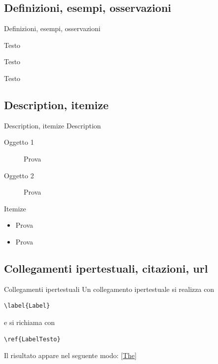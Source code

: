 \documentclass[aspectratio=169, compress]{beamer}
\begin{document}
\subsection{Definizioni, esempi, osservazioni}
\begin{frame}[squeeze]{Definizioni, esempi, osservazioni}
\begin{De}	 Testo	\end{De}\vspace{1cm}
\begin{Exa}			Testo		\end{Exa}\vspace{1cm}
\begin{Oss}	Testo		\end{Oss}
\end{frame}
\subsection{Description, itemize}
\begin{frame}{Description, itemize}
Description
\begin{description}
	\item[Oggetto 1] Prova
	\item[Oggetto 2] Prova
\end{description}
Itemize
\begin{itemize}
	\item Prova
	\item Prova
\end{itemize}
\end{frame}
\subsection{Collegamenti ipertestuali, citazioni, url}
\begin{frame}{Collegamenti ipertestuali}
	Un collegamento ipertestuale si realizza con
			\begin{verbatim}\label{Label}\end{verbatim}		
	e si richiama con 	\label{LabelTesto}
 	\begin{verbatim}\ref{LabelTesto}\end{verbatim}
	Il risultato appare nel seguente modo: \ref{The}
\end{frame}
\end{document}
